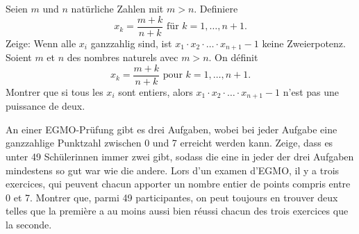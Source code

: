 \documentclass[language=french,style=exam]{smo} %
\begin{document}
\begin{enumerate}
{\bigskip
\bigskip

\item[\textbf{11.}] %

\ifgerman %
Seien $m$ und $n$ natürliche Zahlen mit $m>n$. Definiere
\[
x_k = \frac{m+k}{n+k}\text{ für }k=1, \ldots, n+1.
\]
Zeige: Wenn alle $x_i$ ganzzahlig sind, ist $x_1\cdot x_2 \cdot \ldots \cdot x_{n+1} - 1$
keine Zweierpotenz.
\fi
\iffrench %
Soient $m$ et $n$ des nombres naturels avec $m>n$. On définit
\[
x_k = \frac{m+k}{n+k}\text{ pour }k=1, \ldots, n+1.
\]
Montrer que si tous les $x_i$ sont entiers, alors $x_1\cdot x_2 \cdot \ldots \cdot x_{n+1} - 1$ n'est pas une puissance de deux.%
\fi
\ifitalian %
\fi

\bigskip
\bigskip

\item[\textbf{12.}] %
\ifgerman %
An einer EGMO-Prüfung gibt es drei Aufgaben, wobei bei jeder Aufgabe eine ganzzahlige Punkt\-zahl zwischen 0 und 7 erreicht werden kann. Zeige, dass es unter 49 Schülerinnen immer zwei gibt, sodass die eine in jeder der drei Aufgaben mindestens so gut war wie die andere.
\fi
\iffrench %
Lors d'un examen d'EGMO, il y a trois exercices, qui peuvent chacun apporter un nombre entier de points compris entre 0 et 7. Montrer que, parmi 49 participantes, on peut toujours en trouver deux telles que la première a au moins aussi bien réussi chacun des trois exercices que la seconde.
\fi
\ifitalian %
\fi
}

\bigskip

\vspace{1cm}


\end{enumerate}
\end{document}
